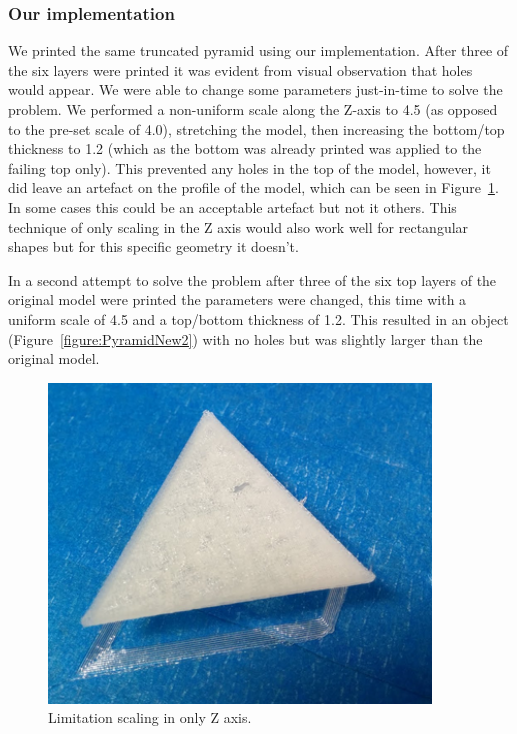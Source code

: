 \documentclass[pdftex, 11pt]{report} %
\begin{document}
\subsubsection{Our implementation}
We printed the same truncated pyramid using our implementation. After three of the six layers were printed it was evident from visual observation that holes would appear. We were able to change some parameters just-in-time to solve the problem. We performed a non-uniform scale along the Z-axis to 4.5 (as opposed to the pre-set scale of 4.0), stretching the model, then increasing the bottom/top thickness to 1.2 (which as the bottom was already printed was applied to the failing top only). This prevented any holes in the top of the model, however, it did leave an artefact on the profile of the model, which can be seen in Figure~\ref{figure:PyramidNew1}. In some cases this could be an acceptable artefact but not it others. This technique of only scaling in the Z axis would also work well for rectangular shapes but for this specific geometry it doesn't.

In a second attempt to solve the problem after three of the six top layers of the original model were printed the parameters were changed, this time with a uniform scale of 4.5 and a top/bottom thickness of 1.2. This resulted in an object (Figure~\ref{figure:PyramidNew2}) with no holes but was slightly larger than the original model.

\begin{figure}[H]
  \centering
  \includegraphics[width=4in]{PyramidOld1.png}
  \caption{Limitation scaling in only Z axis.}
  \label{figure:PyramidNew1}
\end{figure}
\end{document}
